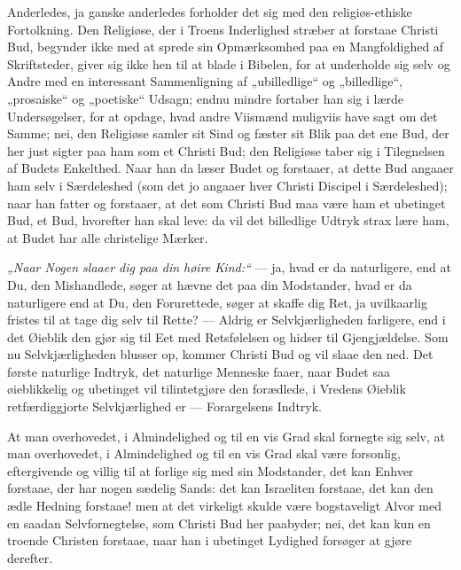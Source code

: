 \documentclass[12pt,a4paper]{book}
\newcommand{\opage}[1]{\marginnote{\footnotesize\textit{[#1]}}}
\begin{document}
Anderledes, ja ganske anderledes forholder det sig med den religiøs-ethiske
Fortolkning. Den Religiøse, der i Troens Inderlighed stræber at forstaae
Christi Bud, begynder ikke med at sprede sin Opmærksomhed paa en
Mangfoldighed af Skriftsteder, giver sig ikke hen til at blade i Bibelen, for
at underholde sig selv og Andre med en interessant Sammenligning af
„ubilledlige“ og „billedlige“, „prosaiske“ og „poetiske“ Udsagn; endnu mindre
fortaber han sig i lærde Undersøgelser, for at opdage, hvad andre Viismænd
muligviis have sagt om det Samme; nei, den Religiøse samler sit Sind og
fæster sit Blik paa det ene Bud, der her just sigter paa ham som et Christi
Bud; den Religiøse taber sig i Tilegnelsen af Budets Enkelthed. Naar han da
læser Budet og forstaaer, at dette Bud angaaer ham selv i Særdeleshed (som
det jo angaaer hver Christi Discipel i Særdeleshed); naar han fatter og
forstaaer, at det som Christi Bud maa være ham et ubetinget Bud, et Bud,
hvorefter han skal leve: da vil det billedlige Udtryk strax lære ham, at
Budet har alle christelige Mærker.

\emph{„Naar Nogen slaaer dig paa din høire Kind:“} --- ja, hvad er da
naturligere, end at Du, den Mishandlede, søger at hævne det paa din
Modstander, hvad er da naturligere end at Du, den Forurettede, søger at
skaffe dig Ret, ja uvilkaarlig fristes
\opage{71} til at tage dig selv til Rette? --- Aldrig er Selvkjærligheden farligere, end
i det Øieblik den gjør sig til Eet med Retsfølelsen og hidser til
Gjengjældelse. Som nu Selvkjærligheden blusser op, kommer Christi Bud og vil
slaae den ned. Det første naturlige Indtryk, det naturlige Menneske faaer,
naar Budet saa øieblikkelig og ubetinget vil tilintetgjøre den forædlede, i
Vredens Øieblik retfærdiggjorte Selvkjærlighed er --- Forargelsens Indtryk.

At man overhovedet, i Almindelighed og til en vis Grad skal fornegte sig
selv, at man overhovedet, i Almindelighed og til en vis Grad skal være
forsonlig, eftergivende og villig til at forlige sig med sin Modstander, det
kan Enhver forstaae, der har nogen sædelig Sands: det kan Israeliten
forstaae, det kan den ædle Hedning forstaae! men at det virkeligt skulde være
bogstaveligt Alvor med en saadan Selvfornegtelse, som Christi Bud her
paabyder; nei, det kan kun en troende Christen forstaae, naar han i ubetinget
Lydighed forsøger at gjøre derefter.
\end{document}
